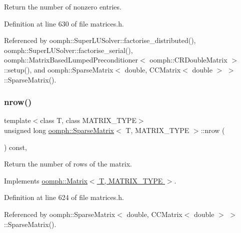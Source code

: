 Return the number of nonzero entries. 



Definition at line 630 of file matrices.\+h.



Referenced by oomph\+::\+Super\+L\+U\+Solver\+::factorise\+\_\+distributed(), oomph\+::\+Super\+L\+U\+Solver\+::factorise\+\_\+serial(), oomph\+::\+Matrix\+Based\+Lumped\+Preconditioner$<$ oomph\+::\+C\+R\+Double\+Matrix $>$\+::setup(), and oomph\+::\+Sparse\+Matrix$<$ double, C\+C\+Matrix$<$ double $>$ $>$\+::\+Sparse\+Matrix().

\mbox{\label{classoomph_1_1SparseMatrix_a21e22f93a942583ca83cea18c23bdd11}} 
\subsubsection{\texorpdfstring{nrow()}{nrow()}}
{\footnotesize\ttfamily template$<$class T, class M\+A\+T\+R\+I\+X\+\_\+\+T\+Y\+PE$>$ \\
unsigned long \hyperlink{classoomph_1_1SparseMatrix}{oomph\+::\+Sparse\+Matrix}$<$ T, M\+A\+T\+R\+I\+X\+\_\+\+T\+Y\+PE $>$\+::nrow (\begin{DoxyParamCaption}{ }\end{DoxyParamCaption}) const\hspace{0.3cm}{\ttfamily [inline]}, {\ttfamily [virtual]}}



Return the number of rows of the matrix. 



Implements \hyperlink{classoomph_1_1Matrix_ac366ca5324d3e00e23d9800f3d5f4d5f}{oomph\+::\+Matrix$<$ T, M\+A\+T\+R\+I\+X\+\_\+\+T\+Y\+P\+E $>$}.



Definition at line 624 of file matrices.\+h.



Referenced by oomph\+::\+Sparse\+Matrix$<$ double, C\+C\+Matrix$<$ double $>$ $>$\+::\+Sparse\+Matrix().

\mbox{\label{classoomph_1_1SparseMatrix_a51c2fc4a13ad870653414fee8daad23d}} 
